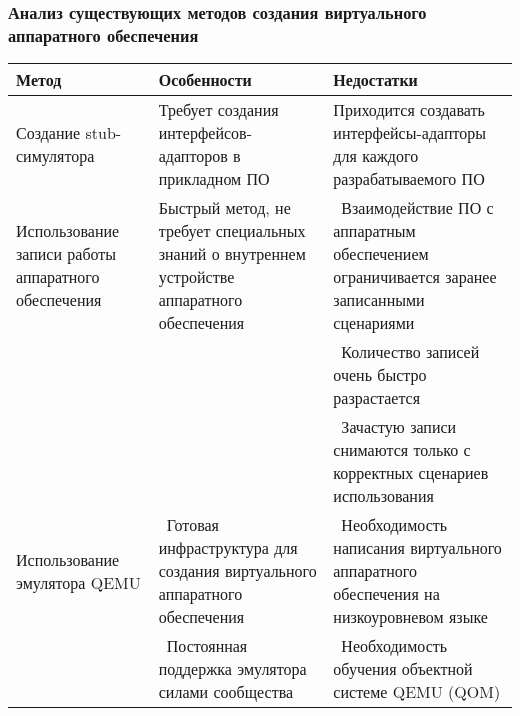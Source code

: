 \begin{frame}%
    \frametitle{Анализ существующих методов создания виртуального аппаратного обеспечения}
    \newcommand{\tabitem}{{\textbullet}~}
        {\scriptsize
            \begin{longtable}{| p{3cm} | p{3cm} | p{4cm} |}
                \hline
                Метод & Особенности & Недостатки \\
                \hline
                    Создание stub-симулятора &
                    Требует создания интерфейсов-адапторов в прикладном ПО &
                    Приходится создавать интерфейсы-адапторы для каждого разрабатываемого ПО \\
                \hline
                    Использование записи работы аппаратного обеспечения &
                    Быстрый метод, не требует специальных знаний о внутреннем устройстве аппаратного обеспечения &
                    \tabitem Взаимодействие ПО с аппаратным обеспечением ограничивается заранее записанными сценариями \\
                \makecell{} & \makecell{} & \tabitem Количество записей очень быстро разрастается \\
                \makecell{} & \makecell{} & \tabitem Зачастую записи снимаются только с корректных сценариев использования \\
                \hline
                Использование эмулятора QEMU &
                \tabitem Готовая инфраструктура для создания виртуального аппаратного обеспечения &
                \tabitem Необходимость написания виртуального аппаратного обеспечения на низкоуровневом языке \\
                \makecell{} &
                \tabitem Постоянная поддержка эмулятора силами сообщества &
                \tabitem Необходимость обучения объектной системе QEMU (QOM) \\
                \hline
            \end{longtable}
        }
\end{frame}


